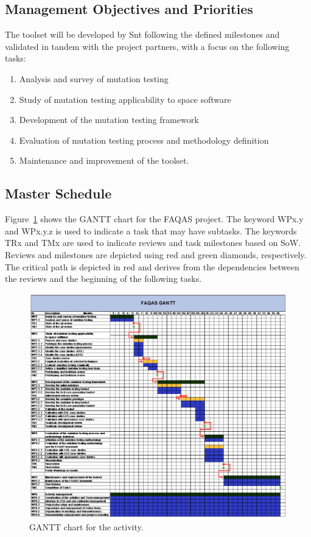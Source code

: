 \subsection{Management Objectives and Priorities}

The toolset will be developed by Snt following the defined milestones and validated in tandem with the project partners, with a focus on the following tasks:
\begin{enumerate}
  \item Analysis and survey of mutation testing
  \item Study of mutation testing applicability to space software
  \item Development of the mutation testing framework
  \item Evaluation of mutation testing process and methodology
definition
  \item Maintenance and improvement of the toolset.
\end{enumerate}


\clearpage


\subsection{Master Schedule}

Figure~\ref{fig:GANTT} shows the GANTT chart for the FAQAS project.
The keyword WPx.y and WPx.y.z is used to indicate a task that may have subtasks. The keywords TRx and TMx are used to indicate reviews and task milestones based on SoW. Reviews and milestones are depicted using red and green diamonds, respectively. The critical path is depicted in red and derives from the dependencies between the reviews and the beginning of the following tasks.

\begin{figure}[H]
\caption{GANTT chart for the activity.}
\label{fig:GANTT}
\centering
\includegraphics[width=\textwidth]{images/gantt}
\end{figure}

